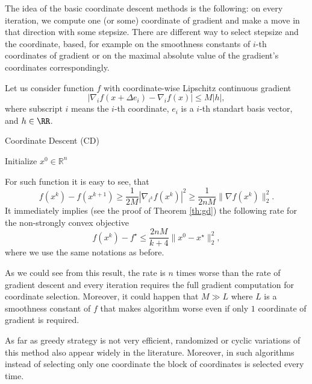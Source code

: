 The idea of the basic coordinate descent methods is the following: on every iteration, we compute one (or some) coordinate of gradient and make a move in that direction with some stepsize. There are different way to select stepsize and the coordinate, based, for example on the smoothness constants of $i$-th coordinates of gradient or on the maximal absolute value of the gradient's coordinates correspondingly. 

Let us consider function $f$ with coordinate-wise Lipschitz continuous gradient
$$
|\nabla_i f(x+\Delta e_i) - \nabla_i f(x)|\leq M|h|,
$$
where subscript $i$ means the $i$-th coordinate, $e_i$ is a $i$-th standart basis vector, and $h\in\RR$.
\begin{algorithm}
    \caption{Coordinate Descent (CD)}
    \label{algo:cd}
    \begin{algorithmic}
        \STATE Initialize $x^0\in\mathbb{R}^n$
        \ENDFOR
    \end{algorithmic}
\end{algorithm}
For such function it is easy to see, that
$$
f(x^{k}) - f(x^{k+1})\geq \frac{1}{2M}|\nabla_{i^k} f(x^k)|^2\geq \frac{1}{2nM}\|\nabla f(x^k)\|_2^2.
$$
It immediately implies (see the proof of Theorem \ref{th:gd}) the following rate for the non-strongly convex objective
$$
f(x^k) - f^\star\leq \frac{2nM}{k+4}\|x^0-x^\star\|_2^2,
$$
where we use the same notations as before. 

As we could see from this result, the rate is $n$ times worse than the rate of gradient descent and every iteration requires the full gradient computation for coordinate selection. Moreover, it could happen that $M\gg L$ where $L$ is a smoothness constant of $f$ that makes algorithm worse even if only $1$ coordinate of gradient is required.

As far as greedy strategy is not very efficient, randomized or cyclic variations of this method also appear widely in the literature. Moreover, in such algorithms instead of selecting only one coordinate the block of coordinates is selected every time.

